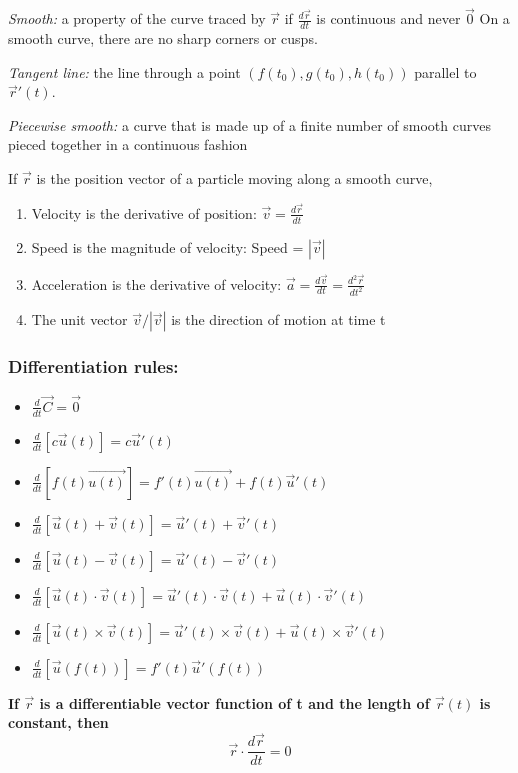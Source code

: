 \documentclass[12pt]{article}
\begin{document}
\emph{Smooth:} a property of the curve traced by $\vec{r}$ if $\frac{d\vec{r}}{dt}$ is continuous and never $\vec{0}$ 
On a smooth curve, there are no sharp corners or cusps. 

\emph{Tangent line:} the line through a point $(f(t_0), g(t_0), h(t_0))$ parallel to $\vec{r}'(t)$. 

\emph{Piecewise smooth:} a curve that is made up of a finite number of smooth curves pieced together in a continuous fashion

If $\vec{r}$ is the position vector of a particle moving along a smooth curve,
\begin{enumerate}
    \item Velocity is the derivative of position: \quad $\vec{v} = \frac{d\vec{r}}{dt}$
    \item Speed is the magnitude of velocity: \quad Speed = $|\vec{v}|$
    \item Acceleration is the derivative of velocity: \quad $\vec{a} = \frac{d\vec{v}}{dt} = \frac{d^2 \vec{r}}{dt^2}$
    \item The unit vector $\vec{v} / |\vec{v}|$ is the direction of motion at time t
\end{enumerate}

\subsubsection{Differentiation rules:}
\begin{itemize}
    \item $\frac{d}{dt} \vec{C} = \vec{0}$
    \item $\frac{d}{dt} [c \vec{u}(t)] = c \vec{u}'(t)$
    \item $\frac{d}{dt} [f(t) \vec{u(t)}] = f'(t) \vec{u(t)} + f(t)\vec{u}'(t)$
    \item $\frac{d}{dt} [\vec{u}(t) + \vec{v}(t)] = \vec{u}'(t) + \vec{v}'(t)$
    \item  $\frac{d}{dt} [\vec{u}(t) - \vec{v}(t)] = \vec{u}'(t) - \vec{v}'(t)$
    \item  $\frac{d}{dt} [\vec{u}(t) \cdot \vec{v}(t)] = \vec{u}'(t) \cdot \vec{v}(t) + \vec{u}(t) \cdot \vec{v}'(t)$
    \item  $\frac{d}{dt} [\vec{u}(t) \times \vec{v}(t)] = \vec{u}'(t) \times \vec{v}(t) + \vec{u}(t) \times \vec{v}'(t)$
    \item $\frac{d}{dt} [\vec{u} (f(t))] = f'(t) \vec{u}'(f(t))$
\end{itemize}

\textbf{If $\vec{r}$ is a differentiable vector function of t and the length of $\vec{r}(t)$ is constant, then}
$$\vec{r} \cdot \frac{d\vec{r}}{dt} = 0$$
\end{document}
